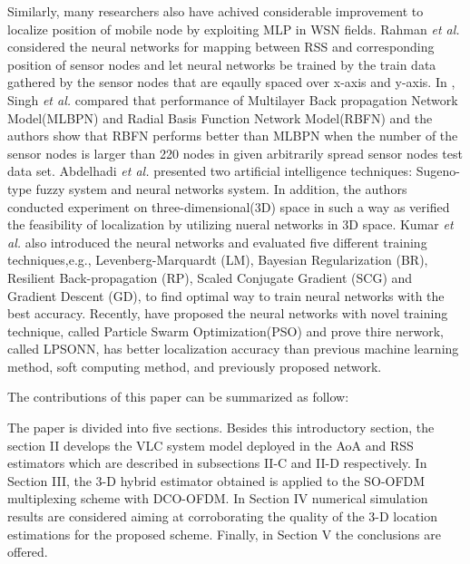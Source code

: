 \documentclass{ieeeaccess}
\begin{document}
Similarly, many researchers also have achived considerable improvement to localize position of mobile node by exploiting MLP\cite{rahman2009localization, singh2013tdoa,abdelhadi2013efficient, kumar2016localization, banihashemian2018new} in WSN fields. Rahman \textit{et al.} \cite{rahman2009localization} considered the neural networks for mapping between RSS and corresponding position of sensor nodes and let neural networks be trained by the train data gathered by the sensor nodes that are eqaully spaced over x-axis and y-axis. In \cite{singh2013tdoa}, Singh \textit{et al.} compared that performance of Multilayer Back propagation Network Model(MLBPN) and Radial Basis Function Network Model(RBFN) and the authors show that RBFN performs better than MLBPN when the number of the sensor nodes is larger than 220 nodes in given arbitrarily spread sensor nodes test data set. Abdelhadi \textit{et al.}  \cite{abdelhadi2013efficient} presented two artificial intelligence techniques: Sugeno-type fuzzy system and neural networks system. In addition, the authors conducted experiment on three-dimensional(3D) space in such a way as verified the feasibility of localization by utilizing nueral networks in 3D space. Kumar \textit{et al.} \cite{kumar2016localization} also introduced the neural networks and evaluated five different training techniques,e.g., Levenberg-Marquardt (LM), Bayesian Regularization
(BR), Resilient Back-propagation (RP), Scaled Conjugate Gradient (SCG) and Gradient
Descent (GD), to find optimal way to train neural networks with the best accuracy. Recently, \cite{banihashemian2018new} have proposed the neural networks with novel training technique, called Particle Swarm Optimization(PSO) and prove thire nerwork, called LPSONN, has better localization accuracy than previous machine learning method, soft computing method, and previously proposed network.

The contributions of this paper can be summarized as
follow:

The paper is divided into five sections. Besides this introductory section, the section II develops the VLC system
model deployed in the AoA and RSS estimators which are
described in subsections II-C and II-D respectively. In Section III, the 3-D hybrid estimator obtained is applied to the
SO-OFDM multiplexing scheme with DCO-OFDM. In Section IV numerical simulation results are considered aiming at
corroborating the quality of the 3-D location estimations for
the proposed scheme. Finally, in Section V the conclusions
are offered.
\end{document}

